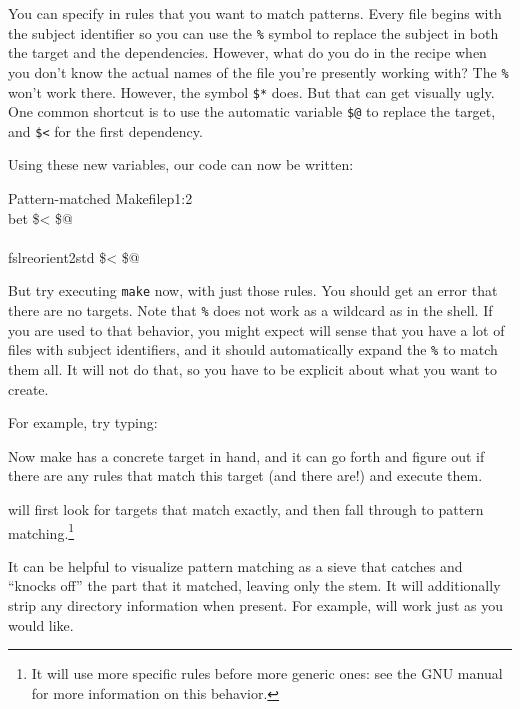 You can specify in rules that you want to match patterns. Every file
begins with the subject identifier so you can use the \texttt{\%}
symbol to replace the subject in both the target and the
dependencies. However, what do you do in the
recipe when you don't know the actual names of the file you're
presently working with? The \texttt{\%} won't work there. However, the
symbol \texttt{\$*} does. But that can get visually ugly. One common
shortcut is to use the automatic variable \texttt{\$@} to replace the
target, and \texttt{\$<} for the first dependency.


Using these new variables, our code can now be written:

\begin{make}{Pattern-matched Makefile}{p1:2}
	 \\
	\tab bet \$< \$@ \\
	
	\\
	\tab fslreorient2std \$< \$@
\end{make}

But try executing \texttt{make} now, with just those rules. You should
get an error that there are no targets. Note that \texttt{\%} does not
work as a wildcard as in the \bashn{} shell. If you are used to that
behavior, you might expect \maken{} will sense that you have a lot of
files with subject identifiers, and it should automatically expand the
\texttt{\%} to match them all. It will not do that, so you have to be
explicit about what you want to create.

For example, try typing:

Now make has a concrete target in hand, and it can go forth and figure out if there are any rules that match this target (and there are!) and execute them. 

\maken{} will first look for targets that match exactly, and then fall
through to pattern matching.\footnote{It will use more specific rules
  before more generic ones: see the GNU \maken{} manual for more
  information on this behavior.}

It can be helpful to visualize pattern matching as a sieve that
catches and ``knocks off'' the part that it matched, leaving only the
stem. It will additionally strip any directory information when
present. For example, \texttt{}
will work just as you would like.

